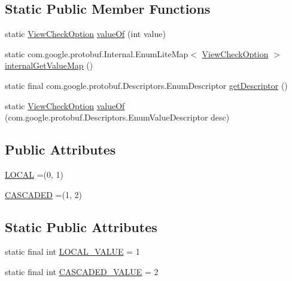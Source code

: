 \subsection*{Static Public Member Functions}
\begin{DoxyCompactItemize}
\item 
static \mbox{\hyperlink{enumcom_1_1mysql_1_1cj_1_1x_1_1protobuf_1_1_mysqlx_crud_1_1_view_check_option}{View\+Check\+Option}} \mbox{\hyperlink{enumcom_1_1mysql_1_1cj_1_1x_1_1protobuf_1_1_mysqlx_crud_1_1_view_check_option_a4843af38e6406af927be67bc4345e996}{value\+Of}} (int value)
\item 
static com.\+google.\+protobuf.\+Internal.\+Enum\+Lite\+Map$<$ \mbox{\hyperlink{enumcom_1_1mysql_1_1cj_1_1x_1_1protobuf_1_1_mysqlx_crud_1_1_view_check_option}{View\+Check\+Option}} $>$ \mbox{\hyperlink{enumcom_1_1mysql_1_1cj_1_1x_1_1protobuf_1_1_mysqlx_crud_1_1_view_check_option_a8fad5bdbfaad079ad53ecb8549ce9666}{internal\+Get\+Value\+Map}} ()
\item 
static final com.\+google.\+protobuf.\+Descriptors.\+Enum\+Descriptor \mbox{\hyperlink{enumcom_1_1mysql_1_1cj_1_1x_1_1protobuf_1_1_mysqlx_crud_1_1_view_check_option_a79a1add53f92d0a8d9c0bf789a15a262}{get\+Descriptor}} ()
\item 
static \mbox{\hyperlink{enumcom_1_1mysql_1_1cj_1_1x_1_1protobuf_1_1_mysqlx_crud_1_1_view_check_option}{View\+Check\+Option}} \mbox{\hyperlink{enumcom_1_1mysql_1_1cj_1_1x_1_1protobuf_1_1_mysqlx_crud_1_1_view_check_option_aec58c4f1de4f1165269f5bb228adb9ed}{value\+Of}} (com.\+google.\+protobuf.\+Descriptors.\+Enum\+Value\+Descriptor desc)
\end{DoxyCompactItemize}
\subsection*{Public Attributes}
\begin{DoxyCompactItemize}
\item 
\mbox{\hyperlink{enumcom_1_1mysql_1_1cj_1_1x_1_1protobuf_1_1_mysqlx_crud_1_1_view_check_option_ab18e917ff8495f0337bbbf5c6dc07383}{L\+O\+C\+AL}} =(0, 1)
\item 
\mbox{\hyperlink{enumcom_1_1mysql_1_1cj_1_1x_1_1protobuf_1_1_mysqlx_crud_1_1_view_check_option_a34e569a3da32cc1a6746e3ab862dcc1c}{C\+A\+S\+C\+A\+D\+ED}} =(1, 2)
\end{DoxyCompactItemize}
\subsection*{Static Public Attributes}
\begin{DoxyCompactItemize}
\item 
static final int \mbox{\hyperlink{enumcom_1_1mysql_1_1cj_1_1x_1_1protobuf_1_1_mysqlx_crud_1_1_view_check_option_a2cdae5757280587dd0588a361144d36b}{L\+O\+C\+A\+L\+\_\+\+V\+A\+L\+UE}} = 1
\item 
static final int \mbox{\hyperlink{enumcom_1_1mysql_1_1cj_1_1x_1_1protobuf_1_1_mysqlx_crud_1_1_view_check_option_ae146abda3cf8edf9b12f55253cff5bc5}{C\+A\+S\+C\+A\+D\+E\+D\+\_\+\+V\+A\+L\+UE}} = 2
\end{DoxyCompactItemize}


